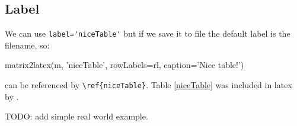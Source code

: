 \subsection{Label}
We can use \lstinline{label='niceTable'} but if we save it to file
the default label is the filename, so:
\begin{sageblock}
matrix2latex(m, 'niceTable', rowLabels=rl, 
                 caption='Nice table!')
\end{sageblock}
can be referenced by \verb!\ref{niceTable}!. Table \ref{niceTable}
was included in latex by \verb!!.


TODO: add simple real world example.


%
%


